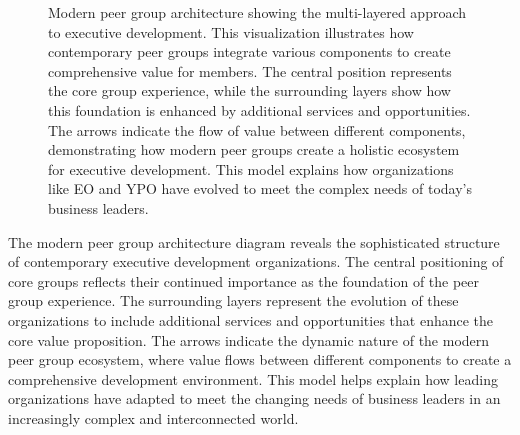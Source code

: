 \documentclass[conference]{IEEEtran}
\begin{document}
\begin{figure}[t]
\centering
{}
\caption{Modern peer group architecture showing the multi-layered approach to executive development. This visualization illustrates how contemporary peer groups integrate various components to create comprehensive value for members. The central position represents the core group experience, while the surrounding layers show how this foundation is enhanced by additional services and opportunities. The arrows indicate the flow of value between different components, demonstrating how modern peer groups create a holistic ecosystem for executive development. This model explains how organizations like EO and YPO have evolved to meet the complex needs of today's business leaders.}
\label{fig:modern_architecture}
\end{figure}

The modern peer group architecture diagram reveals the sophisticated structure of contemporary executive development organizations. The central positioning of core groups reflects their continued importance as the foundation of the peer group experience. The surrounding layers represent the evolution of these organizations to include additional services and opportunities that enhance the core value proposition. The arrows indicate the dynamic nature of the modern peer group ecosystem, where value flows between different components to create a comprehensive development environment. This model helps explain how leading organizations have adapted to meet the changing needs of business leaders in an increasingly complex and interconnected world.
\end{document}
